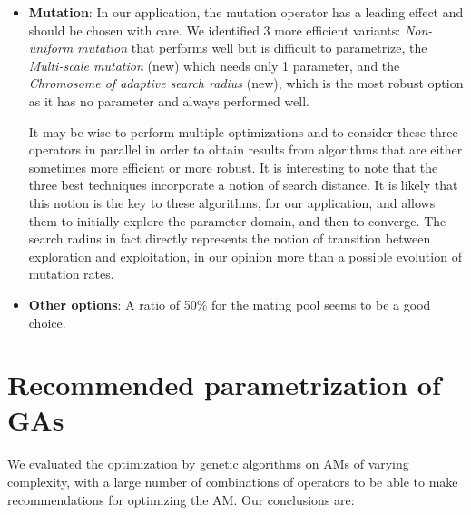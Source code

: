 \documentclass[twocol]{ametsoc}
\begin{document}
\begin{itemize}
	\item \textbf{Mutation}: In our application, the mutation operator has a leading effect and should be chosen with care. We identified 3 more efficient variants: \textit{Non-uniform mutation} \citep{Michalewicz1996} that performs well but is difficult to parametrize, the \textit{Multi-scale mutation} (new) which needs only 1 parameter, and the \textit{Chromosome of adaptive search radius} (new), which is the most robust option as it has no parameter and always performed well.
	
	It may be wise to perform multiple optimizations and to consider these three operators in parallel in order to obtain results from algorithms that are either sometimes more efficient or more robust. It is interesting to note that the three best techniques incorporate a notion of search distance. It is likely that this notion is the key to these algorithms, for our application, and allows them to initially explore the parameter domain, and then to converge. The search radius in fact directly represents the notion of transition between exploration and exploitation, in our opinion more than a possible evolution of mutation rates.
	
	\item \textbf{Other options}: A ratio of 50\% for the mating pool seems to be a good choice.
	
\end{itemize}


\section{Recommended parametrization of GAs}

We evaluated the optimization by genetic algorithms on AMs of varying complexity, with a large number of combinations of operators to be able to make recommendations for optimizing the AM. Our conclusions are:
\end{document}
